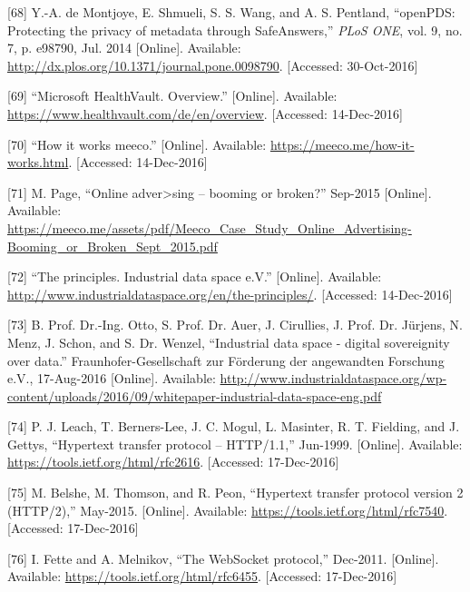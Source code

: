 \documentclass[12pt,english,a4paper,titlepage,cleardoublepage=empty,dottedtoc]{report}
\begin{document}
\hypertarget{ref-paper_2014_openpds_protecting-privacy-of-meta-data-through-safeanswers}{}
{[}68{]} Y.-A. de Montjoye, E. Shmueli, S. S. Wang, and A. S. Pentland,
``openPDS: Protecting the privacy of metadata through SafeAnswers,''
\emph{PLoS ONE}, vol. 9, no. 7, p. e98790, Jul. 2014 {[}Online{]}.
Available: \url{http://dx.plos.org/10.1371/journal.pone.0098790}.
{[}Accessed: 30-Oct-2016{]}

\hypertarget{ref-web_microsoft_healthvault}{}
{[}69{]} ``Microsoft HealthVault. Overview.'' {[}Online{]}. Available:
\url{https://www.healthvault.com/de/en/overview}. {[}Accessed:
14-Dec-2016{]}

\hypertarget{ref-web_meeco_how-it-works}{}
{[}70{]} ``How it works meeco.'' {[}Online{]}. Available:
\url{https://meeco.me/how-it-works.html}. {[}Accessed: 14-Dec-2016{]}

\hypertarget{ref-slides_2015_meeco-case-study}{}
{[}71{]} M. Page, ``Online adver\textgreater{}sing -- booming or
broken?'' Sep-2015 {[}Online{]}. Available:
\url{https://meeco.me/assets/pdf/Meeco_Case_Study_Online_Advertising-Booming_or_Broken_Sept_2015.pdf}

\hypertarget{ref-web_industrial-data-space}{}
{[}72{]} ``The principles. Industrial data space e.V.'' {[}Online{]}.
Available: \url{http://www.industrialdataspace.org/en/the-principles/}.
{[}Accessed: 14-Dec-2016{]}

\hypertarget{ref-whitepaper_2016_industrial-data-space}{}
{[}73{]} B. Prof. Dr.-Ing. Otto, S. Prof. Dr. Auer, J. Cirullies, J.
Prof. Dr. Jürjens, N. Menz, J. Schon, and S. Dr. Wenzel, ``Industrial
data space - digital sovereignity over data.'' Fraunhofer-Gesellschaft
zur Förderung der angewandten Forschung e.V., 17-Aug-2016 {[}Online{]}.
Available:
\url{http://www.industrialdataspace.org/wp-content/uploads/2016/09/whitepaper-industrial-data-space-eng.pdf}

\hypertarget{ref-web_spec_http1}{}
{[}74{]} P. J. Leach, T. Berners-Lee, J. C. Mogul, L. Masinter, R. T.
Fielding, and J. Gettys, ``Hypertext transfer protocol -- HTTP/1.1,''
Jun-1999. {[}Online{]}. Available:
\url{https://tools.ietf.org/html/rfc2616}. {[}Accessed: 17-Dec-2016{]}

\hypertarget{ref-web_spec_http2}{}
{[}75{]} M. Belshe, M. Thomson, and R. Peon, ``Hypertext transfer
protocol version 2 (HTTP/2),'' May-2015. {[}Online{]}. Available:
\url{https://tools.ietf.org/html/rfc7540}. {[}Accessed: 17-Dec-2016{]}

\hypertarget{ref-web_spec_websockets}{}
{[}76{]} I. Fette and A. Melnikov, ``The WebSocket protocol,'' Dec-2011.
{[}Online{]}. Available: \url{https://tools.ietf.org/html/rfc6455}.
{[}Accessed: 17-Dec-2016{]}
\end{document}
